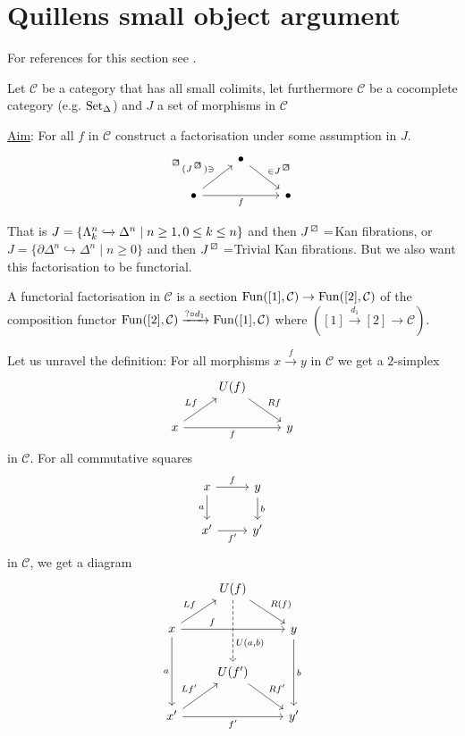 \section{Quillens small object argument}

For references for this section see \cite[Section 12.2]{Riehl_2014}.

Let $\mathcal{C}$ be a category that has all small colimits, let furthermore $\mathcal{C}$ be a cocomplete category (e.g. $\operatorname{Set}_{\Delta}$)
and $J$ a set of morphisms in $\mathcal{C}$

\underline{Aim}: For all $f$ in $\mathcal{C}$ construct a factorisation under some assumption in $J$.
\[
\begin{tikzcd}
    &
    \bullet
    \ar[rd, "{\in J^{\lift{}}}"]
    &
    \\
    \bullet
    \ar[ru, " \prescript{\lift{}}{}{(J^{\lift{}})} \ni"]
    \ar[rr, "f"']
    &&
    \bullet
\end{tikzcd}
\]

That is $J= \{ \Lambda_k^n \xhookrightarrow{} \Delta^n \mid n\geq 1, 0 \leq k \leq n\}$ and then $J^{\lift{}}=$Kan fibrations, or $J=\{ \partial \Delta^n \hookrightarrow \Delta^n \mid n \geq 0 \}$ and then $J^{\lift{}}=$Trivial Kan fibrations.
But we also want this factorisation to be functorial.

\begin{defi}
    A functorial factorisation in $\mathcal{C}$ is a section
    $\operatorname{Fun}([1], \mathcal{C}) \to \operatorname{Fun}([2], \mathcal{C})$
    of the composition functor $\operatorname{Fun}([2], \mathcal{C}) \xrightarrow{? \circ d_1}\operatorname{Fun}([1], \mathcal{C})$
    where $([1] \xrightarrow{d_1} [2] \to \mathcal{C})$.
\end{defi}

Let us unravel the definition:
For all morphisms $x \xrightarrow{f}y$ in $\mathcal{C}$ we get a $2$-simplex
\[
    \begin{tikzcd}
        &
        U(f) \ar[rd,"Rf"]
        &
        \\
        x
        \ar[ru, "Lf"]
        \ar[rr, "f"']
        &&
        y
    \end{tikzcd}
\]
in $\mathcal{C}$.
For all commutative squares 
\[
\begin{tikzcd}
    x
    \ar[r, "f"]
    \ar[d, "a"']
    &
    y
    \ar[d, "b"]
    \\
    x'
    \ar[r, "f'"']
    &
    y'
\end{tikzcd}
\]
in $\mathcal{C}$, we get a diagram
\[
\begin{tikzcd}
    &
    U(f)
    \ar[dd, dashed, "{U(a,b)}" pos=0.7]
    \ar[dr,"R(f)"]
    \\
    x
    \ar[dd,"a"']
    \ar[rr,"f" pos=0.3]
    \ar[ru,"Lf"]
    &&
    y
    \ar[dd,"b"]
    \\
    &
    U(f')
    \ar[rd,"Rf'"]
    \\
    x'
    \ar[ru,"Lf'"]
    \ar[rr,"f'"']
    &&
    y'
\end{tikzcd}
\]

